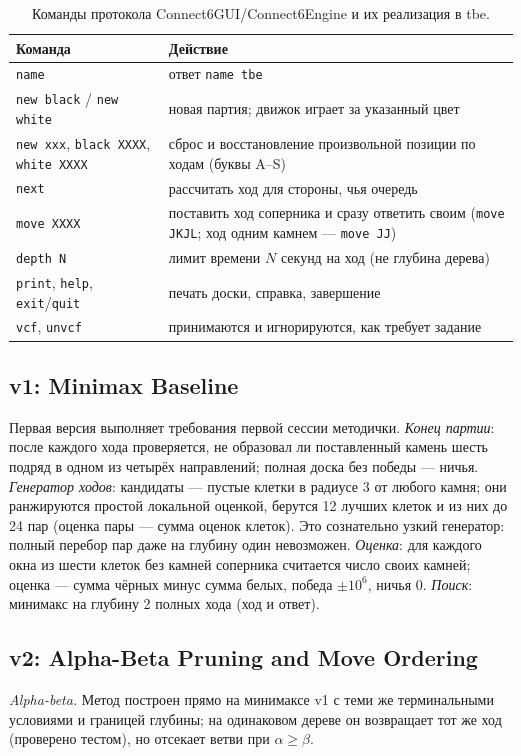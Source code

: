\documentclass[a4paper,10pt,twocolumn]{article}
\newcommand{\code}[1]{\texttt{#1}}
\begin{document}
\begin{table}[t]
\centering
\caption{Команды протокола Connect6GUI/\allowbreak{}Connect6Engine \citep{connect6gui} и их реализация в tbe.}
\label{tab:protocol}
\begin{tabularx}{\textwidth}{@{}lX@{}}
\toprule
Команда & Действие \\
\midrule
\code{name} & ответ \code{name tbe} \\
\code{new black} / \code{new white} & новая партия; движок играет за указанный цвет \\
\code{new xxx}, \code{black XXXX}, \code{white XXXX} & сброс и восстановление произвольной позиции по ходам (буквы A--S) \\
\code{next} & рассчитать ход для стороны, чья очередь \\
\code{move XXXX} & поставить ход соперника и сразу ответить своим (\code{move JKJL}; ход одним камнем --- \code{move JJ}) \\
\code{depth N} & лимит времени $N$ секунд на ход (не глубина дерева) \\
\code{print}, \code{help}, \code{exit}/\code{quit} & печать доски, справка, завершение \\
\code{vcf}, \code{unvcf} & принимаются и игнорируются, как требует задание \\
\bottomrule
\end{tabularx}
\end{table}

\subsection{v1: Minimax Baseline}
Первая версия выполняет требования первой сессии методички.
\emph{Конец партии}: после каждого хода проверяется, не образовал ли поставленный камень шесть подряд в одном из четырёх направлений; полная доска без победы --- ничья.
\emph{Генератор ходов}: кандидаты --- пустые клетки в радиусе 3 от любого камня; они ранжируются простой локальной оценкой, берутся 12 лучших клеток и из них до 24 пар (оценка пары --- сумма оценок клеток). Это сознательно узкий генератор: полный перебор пар даже на глубину один невозможен.
\emph{Оценка}: для каждого окна из шести клеток без камней соперника считается число своих камней; оценка --- сумма чёрных минус сумма белых, победа $\pm10^6$, ничья 0.
\emph{Поиск}: минимакс на глубину 2 полных хода (ход и ответ).

\subsection{v2: Alpha-Beta Pruning and Move Ordering}
\emph{Alpha-beta.} Метод построен прямо на минимаксе v1 с теми же терминальными условиями и границей глубины; на одинаковом дереве он возвращает тот же ход (проверено тестом), но отсекает ветви при $\alpha\ge\beta$.
\end{document}
